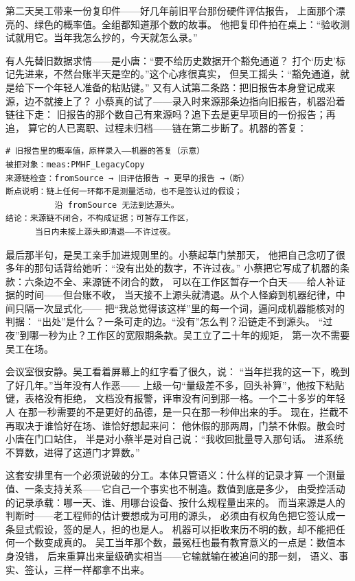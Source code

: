 第二天吴工带来一份复印件——好几年前旧平台那份硬件评估报告，
上面那个漂亮的、绿色的概率值。全组都知道那个数的故事。
他把复印件拍在桌上：“验收测试就用它。当年我怎么抄的，今天就怎么录。”

有人先替旧数据求情——是小唐：“要不给历史数据开个豁免通道？
打个‘历史’标记先进来，不然台账半天是空的。”这个心疼很真实，
但吴工摇头：“豁免通道，就是给下一个年轻人准备的粘贴键。”
又有人试第二条路：把旧报告本身登记成来源，边不就接上了？
小蔡真的试了——录入时来源那条边指向旧报告，机器沿着链往下走：
旧报告的那个数自己有来源吗？追下去是更早项目的一份报告；再追，
算它的人已离职、过程未归档——链在第二步断了。机器的答复：

\nopagebreak[4]
\begin{codebox}
\begin{Verbatim}[fontsize=\small,breaklines=true,breakanywhere=true,breaksymbolleft={},breaksymbolright={}]
# 旧报告里的概率值，原样录入——机器的答复（示意）
被拒对象：meas:PMHF_LegacyCopy
来源链检查：fromSource → 旧评估报告 → 更早的报告 →（断）
断点说明：链上任何一环都不是测量活动，也不是签认过的假设；
          沿 fromSource 无法到达源头。
结论：来源链不闭合，不构成证据；可暂存工作区，
      当日内未接上源头即清退——不许过夜。
\end{Verbatim}
\end{codebox}

最后那半句，是吴工亲手加进规则里的。小蔡起草门禁那天，
他把自己念叨了很多年的那句话背给她听：“没有出处的数字，不许过夜。”
小蔡把它写成了机器的条款：六条边不全、来源链不闭合的数，
可以在工作区暂存一个白天——给人补证据的时间——但台账不收，
当天接不上源头就清退。从个人怪癖到机器纪律，中间只隔一次显式化——
把“我总觉得该这样”里的每一个词，逼问成机器能核对的判据：
“出处”是什么？一条可走的边。“没有”怎么判？沿链走不到源头。
“过夜”到哪一秒为止？工作区的宽限期条款。吴工立了二十年的规矩，
第一次不需要吴工在场。

会议室很安静。吴工看着屏幕上的红字看了很久，说：
“当年拦我的这一下，晚到了好几年。”当年没有人作恶——
上级一句“量级差不多，回头补算”，他按下粘贴键，表格没有拒绝，
文档没有报警，评审没有问到那一格。一个二十多岁的年轻人
在那一秒需要的不是更好的品德，是一只在那一秒伸出来的手。
现在，拦截不再取决于谁恰好在场、谁恰好想起来问：
他休假的那两周，门禁不休假。散会时小唐在门口站住，
半是对小蔡半是对自己说：“我收回批量导入那句话。
进系统不算数，进得了这道门才算数。”

这套安排里有一个必须说破的分工。本体只管语义：什么样的记录才算
一个测量值、一条支持关系——它自己一个事实也不制造。数值到底是多少，
由受控活动的记录承载：哪一天、谁、用哪台设备、按什么规程量出来的。
而当来源是人的判断时——老工程师的估计要想成为可用的源头，
必须由有权角色把它签认成一条显式假设，签的是人，担的也是人。
机器可以拒收来历不明的数，却不能把任何一个数变成真的。
吴工当年那个数，最冤枉也最有教育意义的一点是：数值本身没错，
后来重算出来量级确实相当——它输就输在被追问的那一刻，
语义、事实、签认，三样一样都拿不出来。

